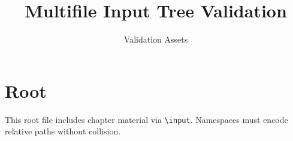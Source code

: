 \documentclass[11pt]{article}
\title{Multifile Input Tree Validation}
\author{Validation Assets}
\date{}
\begin{document}
\maketitle

\section{Root}
\label{sec:root}

This root file includes chapter material via \texttt{\textbackslash input}.
Namespaces must encode relative paths without collision.



\end{document}
